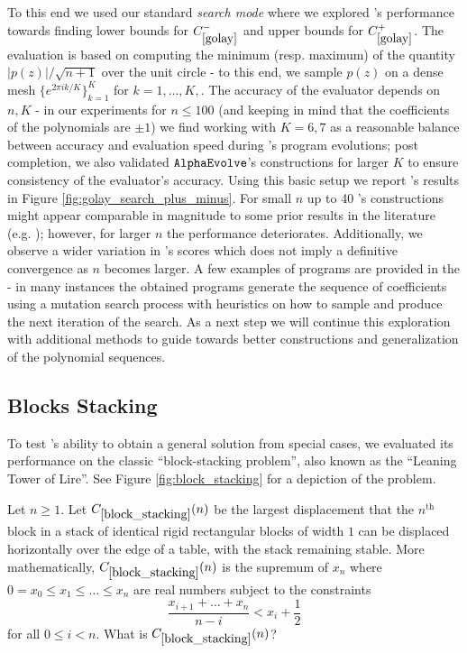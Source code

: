 To this end we used our standard \textit{search mode} where we explored \AlphaEvolve's performance towards finding lower bounds for $C^-_{\ref{golay}}$ and upper bounds for $C^+_{\ref{golay}}$. The evaluation is based on computing the minimum (resp. maximum) of the quantity $|p(z)| / \sqrt{n + 1}$ over the unit circle - to this end, we sample $p(z)$ on a dense mesh $\{e^{2\pi i k / K}\}_{k=1}^K$ for $k = 1, \dots, K, $. The accuracy of the evaluator depends on $n, K$ - in our experiments for $n \leq 100$ (and keeping in mind that the coefficients of the polynomials are $\pm 1$) we find working with $K = 6, 7$ as a reasonable balance between accuracy and evaluation speed during \AlphaEvolve's program evolutions; post completion, we also validated $\texttt{AlphaEvolve}$'s constructions for larger $K$ to ensure consistency of the evaluator's accuracy. Using this basic setup we report \AlphaEvolve's results in Figure \ref{fig:golay_search_plus_minus}. For small $n$ up to 40 \AlphaEvolve's constructions might appear comparable in magnitude to some prior results in the literature (e.g. \cite{odlyzko}); however, for larger $n$ the performance deteriorates. Additionally, we observe a wider variation in \AlphaEvolve's scores which does not imply a definitive convergence as $n$ becomes larger. A few examples of \AlphaEvolve programs are provided in the \Repo - in many instances the obtained programs generate the sequence of coefficients using a mutation search process with heuristics on how to sample and produce the next iteration of the search. As a next step we will continue this exploration with additional methods to guide \AlphaEvolve towards better constructions and generalization of the polynomial sequences.


\subsection{Blocks Stacking} 

To test \AlphaEvolve's ability to obtain a general solution from special cases, we evaluated its performance on the classic ``block-stacking problem'', also known as the ``Leaning Tower of Lire''. See Figure \ref{fig:block_stacking} for a depiction of the problem.

\renewcommand{\problemURL}{https://google-deepmind.github.io/alphaevolve_repository_of_problems/problems/29.html}

\begin{problem}
\label{block_stacking}  Let $n \geq 1$.  Let $C_{\ref{block_stacking}}(n)$ be the largest displacement that the $n^{\mathrm{th}}$ block in a stack of identical rigid rectangular blocks of width $1$ can be displaced horizontally over the edge of a table, with the stack remaining stable.  More mathematically, $C_{\ref{block_stacking}}(n)$ is the supremum of $x_n$ where $0 = x_0 \leq x_1 \leq \dots\leq x_n$ are real numbers subject to the constraints
$$ \frac{x_{i+1}+\dots+x_n}{n-i} < x_i + \frac{1}{2}$$
for all $0 \leq i < n$.  What is $C_{\ref{block_stacking}}(n)$?
\end{problem}

